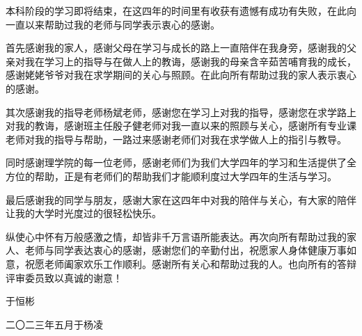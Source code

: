 \begin{acknowledgement}

本科阶段的学习即将结束，在这四年的时间里有收获有遗憾有成功有失败，在此向一直以来帮助过我的老师与同学表示衷心的感谢。

首先感谢我的家人，感谢父母在学习与成长的路上一直陪伴在我身旁，感谢我的父亲对我在学习上的指导与在做人上的教诲，感谢我的母亲含辛茹苦哺育我的成长，感谢姥姥爷爷对我在求学期间的关心与照顾。在此向所有帮助过我的家人表示衷心的感谢。

其次感谢我的指导老师杨斌老师，感谢您在学习上对我的指导，感谢您在求学路上对我的教诲，感谢班主任殷子健老师对我一直以来的照顾与关心，感谢所有专业课老师对我的指导与帮助，一路过来感谢老师们对我在求学做人上的指引与教导。

同时感谢理学院的每一位老师，感谢老师们为我们大学四年的学习和生活提供了全方位的帮助，正是有老师们的帮助我们才能顺利度过大学四年的生活与学习。

最后感谢我的同学与朋友，感谢大家在这四年中对我的陪伴与关心，有大家的陪伴让我的大学时光度过的很轻松快乐。

纵使心中怀有万般感激之情，却皆非千万言语所能表达。再次向所有帮助过我的家人、老师与同学表达衷心的感谢，感谢您们的辛勤付出，祝愿家人身体健康万事如意，祝愿老师阖家欢乐工作顺利。感谢所有关心和帮助过我的人。也向所有的答辩评审委员致以真诚的谢意！

\begin{flushright}
         于恒彬

二〇二三年五月于\quad 杨凌
\end{flushright}




\end{acknowledgement}
